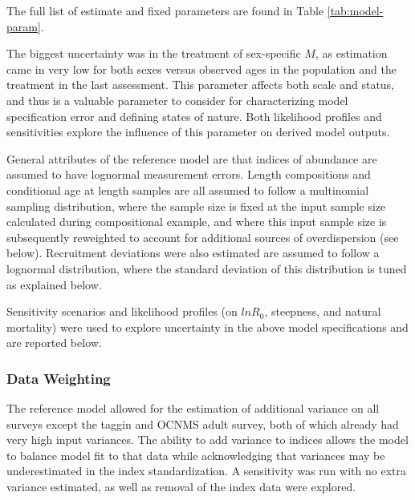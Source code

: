 \documentclass[11pt,
  english,
  letterpaper,
]{article}
\begin{document}
The full list of estimate and fixed parameters are found in Table \ref{tab:model-param}.

The biggest uncertainty was in the treatment of sex-specific \(M\), as estimation came in very low for both sexes versus observed ages in the population and the treatment in the last assessment. This parameter affects both scale and status, and thus is a valuable parameter to consider for characterizing model specification error and defining states of nature. Both likelihood profiles and sensitivities explore the influence of this parameter on derived model outputs.

General attributes of the reference model are that indices of abundance are assumed to have lognormal measurement errors. Length compositions and conditional age at length samples are all assumed to follow a multinomial sampling distribution, where the sample size is fixed at the input sample size calculated during compositional example, and where this input sample size is subsequently reweighted to account for additional sources of overdispersion (see below). Recruitment deviations were also estimated are assumed to follow a lognormal distribution, where the standard deviation of this distribution is tuned as explained below.

Sensitivity scenarios and likelihood profiles (on \(lnR_0\), steepness, and natural mortality) were used to explore uncertainty in the above model specifications and are reported below.

\hypertarget{data-weighting}{%
\subsubsection{Data Weighting}\label{data-weighting}}

The reference model allowed for the estimation of additional variance on all surveys except the taggin and OCNMS adult survey, both of which already had very high input variances. The ability to add variance to indices allows the model to balance model fit to that data while acknowledging that variances may be underestimated in the index standardization. A sensitivity was run with no extra variance estimated, as well as removal of the index data were explored.
\end{document}
